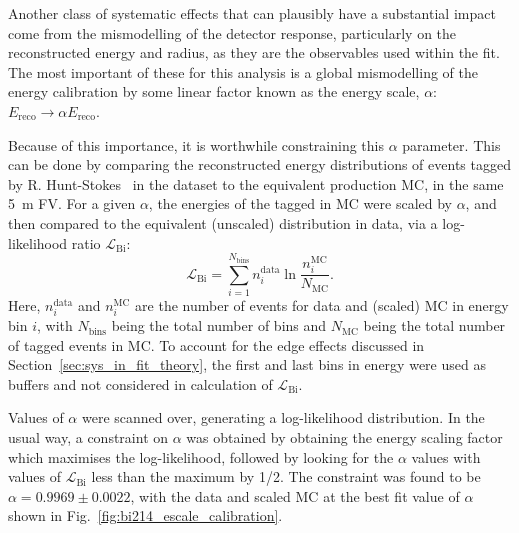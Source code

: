 Another class of systematic effects that can plausibly have a substantial impact come from the mismodelling of the detector response, particularly on the reconstructed energy and radius, as they are the observables used within the fit. The most important of these for this analysis is a global mismodelling of the energy calibration by some linear factor known as the energy scale, $\alpha$: $E_{\mathrm{reco}}\to\alpha E_{\mathrm{reco}}$.

Because of this importance, it is worthwhile constraining this $\alpha$ parameter. This can be done by comparing the reconstructed energy distributions of  events tagged by R. Hunt-Stokes~\cite{hunt-stokesPrivateCommunication2023} %
in the dataset to the equivalent production MC, in the same \SI{5}{\m} FV. For a given $\alpha$, the energies of the tagged  in MC were scaled by $\alpha$, and then compared to the equivalent (unscaled) distribution in data, via a log-likelihood ratio $\mathcal{L}_{\mathrm{Bi}}$:
\begin{equation}
    \mathcal{L}_{\mathrm{Bi}} = 
    \sum_{i=1}^{N_{\mathrm{bins}}}
        n_{i}^{\mathrm{data}}\ln{\frac{n_{i}^{\mathrm{MC}}}{N_{\mathrm{MC}}}}.
\end{equation}
Here, $n_{i}^{\mathrm{data}}$ and $n_{i}^{\mathrm{MC}}$ are the number of events for data and (scaled) MC in energy bin $i$, with $N_{\mathrm{bins}}$ being the total number of bins and $N_{\mathrm{MC}}$ being the total number of tagged events in MC. To account for the edge effects discussed in Section~\ref{sec:sys_in_fit_theory}, the first and last bins in energy were used as buffers and not considered in calculation of $\mathcal{L}_{\mathrm{Bi}}$.

Values of $\alpha$ were scanned over, generating a log-likelihood distribution. In the usual way, a constraint on $\alpha$ was obtained by obtaining the energy scaling factor which maximises the log-likelihood, followed by looking for the $\alpha$ values with values of $\mathcal{L}_{\mathrm{Bi}}$ less than the maximum by 1/2. The constraint was found to be $\alpha = 0.9969\pm0.0022$, with the data and scaled MC at the best fit value of $\alpha$ shown in Fig.~\ref{fig:bi214_escale_calibration}.

